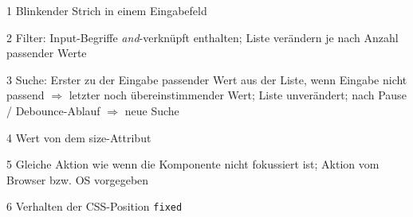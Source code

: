 \begin{table}[!htb]
\begin{adjustbox}{max width=\textwidth}
\begin{threeparttable}
\begin{tablenotes}
                \item[1] Blinkender Strich in einem Eingabefeld
                \item[2] Filter: Input-Begriffe \emph{and}-verknüpft enthalten; 
                                Liste verändern je nach Anzahl passender Werte
                \item[3] Suche: Erster zu der Eingabe passender Wert aus der Liste, wenn Eingabe nicht passend $\Rightarrow$ letzter noch übereinstimmender Wert; 
                                Liste unverändert; nach Pause / Debounce-Ablauf $\Rightarrow$ neue Suche
                \item[4] Wert von dem size-Attribut
                \item[5] Gleiche Aktion wie wenn die Komponente nicht fokussiert ist; Aktion vom Browser bzw. OS vorgegeben
                \item[6] Verhalten der CSS-Position \texttt{fixed}
            \end{tablenotes}
        \end{threeparttable}
    \end{adjustbox}
\end{table}
